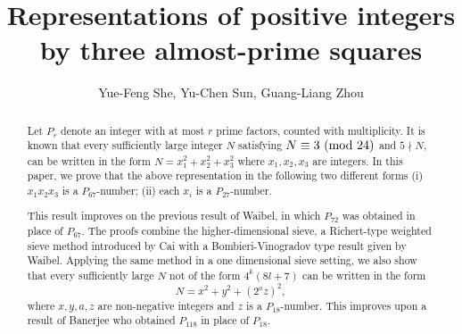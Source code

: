 \documentclass[12pt,a4paper,reqno]{amsart}
\numberwithin{equation}{section}
\def\pmod #1{\ ({\rm{mod}}\ #1)}
\theoremstyle{plain}
\theoremstyle{definition}
\begin{document}
\title
[{Representations of positive integers by three almost-prime squares}]
{Representations of positive integers by three almost-prime squares}

\author
[Yue-Feng She, Yu-Chen Sun, Guang-Liang Zhou]
{Yue-Feng She, Yu-Chen Sun, Guang-Liang Zhou}

\address {(Yue-Feng She) Department of Applied Mathematics, Nanjing Forestry University, Nanjing 210037, People's Republic of China}

\address {(Yu-Chen Sun) School of Mathematics, University of Bristol, Bristol, BS8 1UG, England, United Kingdom}

\address{(Guang-Liang Zhou) Department of Applied Mathematics, Nanjing Forestry University, Nanjing 210037, People's Republic of China}



\begin{abstract}
Let $P_r$ denote an integer with at most $r$ prime factors, counted with multiplicity. It is known that
every sufficiently large integer $N$ satisfying 
$N \equiv 3 \pmod{24}$ and $5 \nmid N$,
can be written in the form $N= x_1^2+x_2^2+x_3^2$ where $x_1,x_2,x_3$ are integers.
In this paper, we prove that the above representation in the following two different forms
(i) $x_1x_2x_3$ is a $P_{67}$-number; (ii) each $x_i$ is a $P_{27}$-number.

This result improves on the previous result of Waibel\cite{Wa}, in which $P_{72}$ was obtained in place of $P_{67}$. The proofs combine the higher-dimensional sieve, a Richert-type weighted sieve method introduced by Cai \cite{Cai} with a Bombieri-Vinogradov type result given by Waibel\cite{Wa}. 
Applying the same method in a one dimensional sieve setting, we also show that 
every sufficiently large $N$ not of the form $4^k(8l+7)$ can be written in the form
\[
N = x^{2} + y^{2} + (2^{a} z)^{2},
\]
where $x,y,a,z$ are non-negative integers and $z$ is a $P_{18}$-number. This improves upon a result of  Banerjee \cite{Ban} who obtained $P_{118}$ in place of $P_{18}$.

 

\end{abstract}
\maketitle
\end{document}
